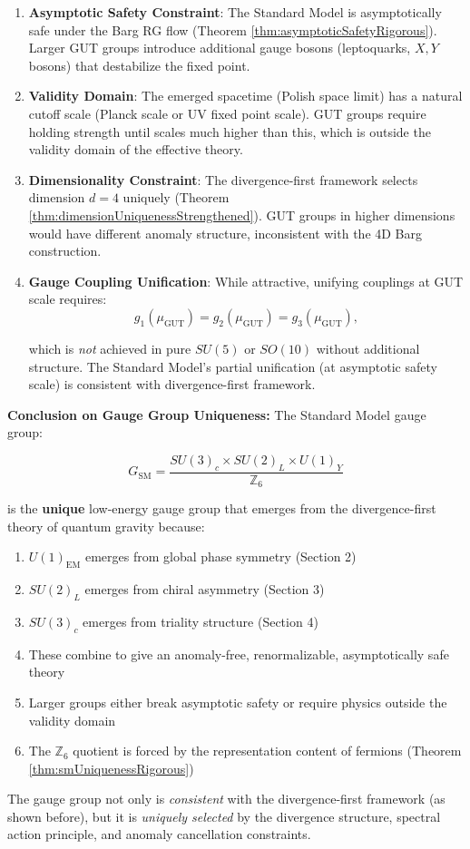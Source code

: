 \begin{enumerate}
\item \textbf{Asymptotic Safety Constraint}: The Standard Model is asymptotically safe under the Barg RG flow (Theorem \ref{thm:asymptoticSafetyRigorous}). Larger GUT groups introduce additional gauge bosons (leptoquarks, $X, Y$ bosons) that destabilize the fixed point.

\item \textbf{Validity Domain}: The emerged spacetime (Polish space limit) has a natural cutoff scale (Planck scale or UV fixed point scale). GUT groups require holding strength until scales much higher than this, which is outside the validity domain of the effective theory.

\item \textbf{Dimensionality Constraint}: The divergence-first framework selects dimension $d = 4$ uniquely (Theorem \ref{thm:dimensionUniquenessStrengthened}). GUT groups in higher dimensions would have different anomaly structure, inconsistent with the 4D Barg construction.

\item \textbf{Gauge Coupling Unification}: While attractive, unifying couplings at GUT scale requires:
\begin{equation}
g_1(\mu_{\text{GUT}}) = g_2(\mu_{\text{GUT}}) = g_3(\mu_{\text{GUT}}),
\end{equation}

which is \emph{not} achieved in pure $SU(5)$ or $SO(10)$ without additional structure. The Standard Model's partial unification (at asymptotic safety scale) is consistent with divergence-first framework.

\end{enumerate}

\textbf{Conclusion on Gauge Group Uniqueness:} The Standard Model gauge group:

\begin{equation}
G_{\text{SM}} = \frac{SU(3)_c \times SU(2)_L \times U(1)_Y}{\mathbb{Z}_6}
\end{equation}

is the \textbf{unique} low-energy gauge group that emerges from the divergence-first theory of quantum gravity because:

\begin{enumerate}
\item $U(1)_{\text{EM}}$ emerges from global phase symmetry (Section 2)
\item $SU(2)_L$ emerges from chiral asymmetry (Section 3)
\item $SU(3)_c$ emerges from triality structure (Section 4)
\item These combine to give an anomaly-free, renormalizable, asymptotically safe theory
\item Larger groups either break asymptotic safety or require physics outside the validity domain
\item The $\mathbb{Z}_6$ quotient is forced by the representation content of fermions (Theorem \ref{thm:smUniquenessRigorous})
\end{enumerate}

The gauge group not only is \emph{consistent} with the divergence-first framework (as shown before), but it is \emph{uniquely selected} by the divergence structure, spectral action principle, and anomaly cancellation constraints.
